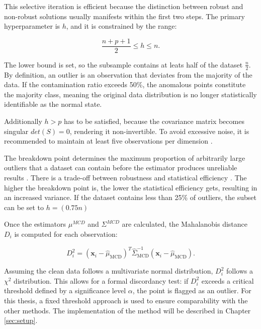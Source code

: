 \newpage
This selective iteration is efficient because the distinction between robust and non-robust solutions usually manifests within the first two steps. 
The primary hyperparameter is $h$, and it is constrained by the range:

\begin{equation}
\frac{n+p+1}{2} \le h \le n.
\end{equation}

The lower bound is set, so the subsample contains at leats half of the dataset $\frac{n}{2}$.
By definition, an outlier is an observation that deviates from the majority of the data. 
If the contamination ratio exceeds 50\%, the anomalous points constitute the majority class, meaning the original data distribution is no longer statistically identifiable as the normal state.


Additionally $h > p$ has to be satisfied, because the covariance matrix becomes singular $det(S)=0$, rendering it non-invertible. 
To avoid excessive noise, it is recommended to maintain at least five observations per dimension \citep{hubert2018minimum}.


The breakdown point determines the maximum proportion of arbitrarily large outliers that a dataset can contain before the estimator produces unreliable results \citep[p. 1894]{hampel1971general}.
There is a trade-off between robustness and statistical efficiency \citep[Chapter 4]{rousseeuw1999fast}.
The higher the breakdown point is, the lower the statistical efficiency gets, resulting in an increased variance. 
If the dataset contains less than 25\% of outliers, the subset can be set to $h = (0.75n)$


Once the estimators $\mu^{MCD}$ and $\Sigma^{MCD}$ are calculated, the Mahalanobis distance $D_i$ is computed for each observation:

\begin{equation}
D_i^2 = (\mathbf{x}_i - \hat{\mu}_{\text{MCD}})^T \hat{\Sigma}_{\text{MCD}}^{-1} (\mathbf{x}_i - \hat{\mu}_{\text{MCD}}).
\label{eq:robust_mahalanobis}
\end{equation}


Assuming the clean data follows a multivariate normal distribution, $D_i^2$ follows a $\chi^2$ distribution.
This allows for a formal discordancy test: if $D_i^2$ exceeds a critical threshold defined by a significance level $\alpha$, the point is flagged as an outlier. 
For this thesis, a fixed threshold approach is used to ensure comparability with the other methods. 
The implementation of the method will be described in Chapter \ref{sec:setup}.


